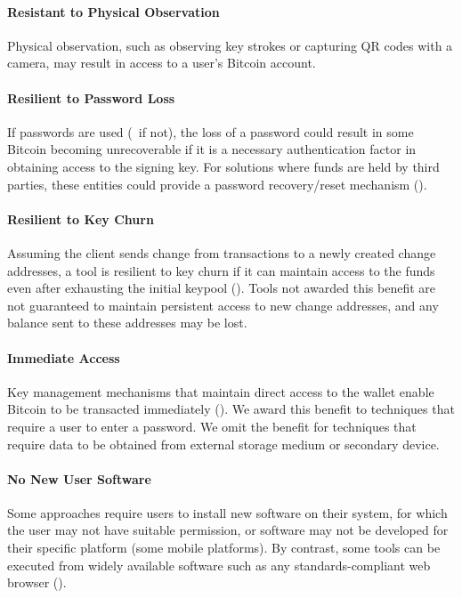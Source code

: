 \paragraph{Resistant to Physical Observation}
\label{Resistant to Physical Observation}
Physical observation, such as observing key strokes or capturing QR codes with a camera, may result in access to a user's Bitcoin account. 

\paragraph{Resilient to Password Loss}
\label{Resilient to Password Loss}
If passwords are used (\full~if not), the loss of a password could result in some Bitcoin becoming unrecoverable if it is a necessary authentication factor in obtaining access to the signing key. For solutions where funds are held by third parties, these entities could provide a password recovery/reset mechanism (\full).

\paragraph{Resilient to Key Churn}
\label{Compatible with Change Keys}
Assuming the client sends change from transactions to a newly created change addresses, a tool is resilient to key churn if it can maintain access to the funds even after exhausting the initial keypool (\full). Tools not awarded this benefit are not guaranteed to maintain persistent access to new change addresses, and any balance sent to these addresses may be lost.

\paragraph{Immediate Access}
\label{Immediate Access}
Key management mechanisms that maintain direct access to the wallet enable Bitcoin to be transacted immediately (\full). We award this benefit to techniques that require a user to enter a password. We omit the benefit for techniques that require data to be obtained from external storage medium or secondary device. 

\paragraph{No New User Software}
\label{No New Software}
Some approaches require users to install new software on their system, for which the user may not have suitable permission, or software may not be developed for their specific platform (\eg some mobile platforms). By contrast, some tools can be executed from widely available software such as any standards-compliant web browser (\full). 

